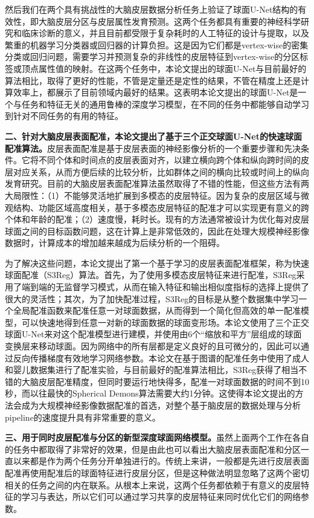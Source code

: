 然后我们在两个具有挑战性的大脑皮层数据分析任务上验证了球面U-Net结构的有效性，即大脑皮层分区与皮层属性发育预测。这两个任务都具有重要的神经科学研究和临床诊断的意义，并且目前都受限于复杂耗时的人工特征的设计与提取，以及繁重的机器学习分类器或回归器的计算负担。这是因为它们都是vertex-wise的密集分类或回归问题，需要学习并预测复杂的非线性的皮层特征到vertex-wise的分区标签或顶点属性值的映射。在这两个任务中，本论文提出的球面U-Net与目前最好的算法相比，取得了更好的性能，不管是定量还是定性的结果，不管在精度上还是计算效率上，都展示了目前领域内最好的结果。这表明本论文提出的球面U-Net是一个与任务和特征无关的通用鲁棒的深度学习模型，在不同的任务中都能够自动学习到针对不同任务的有用的特征。

\textbf{二、针对大脑皮层表面配准，本论文提出了基于三个正交球面U-Net的快速球面配准算法。}皮层表面配准是基于皮层表面的神经影像分析的一个重要步骤和先决条件。它将不同个体和时间点的皮层表面对齐，以建立横向跨个体和纵向跨时间的皮层对应关系，从而方便后续的比较分析，比如群体之间的横向比较或时间上的纵向发育研究。目前的大脑皮层表面配准算法虽然取得了不错的性能，但这些方法有两大局限性：（1）不能够灵活地扩展到多模态的皮层特征。因为复杂的皮层区域与微观结构、功能区域高度相关，基于多模态皮层特征的配准才可以实现更有意义的跨个体和年龄的配准；（2）速度慢，耗时长。现有的方法通常被设计为优化每对皮层球面之间的目标函数问题，这在计算上是非常低效的，因此在处理大规模神经影像数据时，计算成本的增加越来越成为后续分析的一个阻碍。

为了解决这些问题，本论文提出了第一个基于学习的皮层表面配准框架，称为快速球面配准（S3Reg）算法。首先，为了使用多模态皮层特征来进行配准，S3Reg采用了端到端的无监督学习模式，从而在输入特征和输出相似度指标的选择上提供了很大的灵活性；其次，为了加快配准过程，S3Reg的目标是从整个数据集中学习一个全局配准函数来配准任意一对球面数据，从而得到一个简化但高效的单一配准模型，可以快速地得到任意一对新的球面数据的球面变形场。本论文使用了三个正交球面U-Net来对这个配准模型进行建模，并使用由6个“缩放和平方”层组成的球面变换层来移动球面。因为网络中的所有层都是定义良好的且可微分的，因此可以通过反向传播梯度有效地学习网络参数。本论文在基于图谱的配准任务中使用了成人和婴儿数据集进行了配准实验，与目前最好的配准算法相比，S3Reg获得了相当不错的大脑皮层配准精度，但同时要运行地快得多，配准一对球面数据的时间不到10秒，而以往最快的Spherical Demons算法需要大约1分钟。这使得本论文提出的方法会成为大规模神经影像数据配准的首选，对整个基于脑皮层的数据处理与分析pipeline的速度提升具有非常重要的意义。

\textbf{三、用于同时皮层配准与分区的新型深度球面网络模型。}虽然上面两个工作在各自的任务中都取得了非常好的效果，但是由此也可以看出大脑皮层表面配准和分区一直以来都是作为两个任务分开单独进行的。传统上来讲，一般都是先进行皮层表面配准再使用配准后的球面特征进行皮层分区，但是这种做法明显忽略了这两个密切相关的任务之间的内在联系。从根本上来说，这两个任务都依赖于有意义的皮层特征的学习与表达，所以它们可以通过学习共享的皮层特征来同时优化它们的网络参数。


